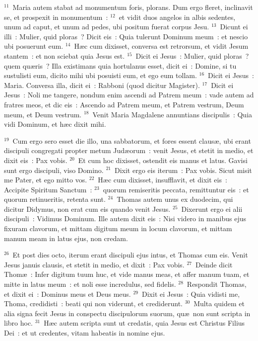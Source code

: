 ${}^{11}$~Maria autem stabat ad monumentum foris, plorans. Dum ergo fleret, inclinavit se, et prospexit in monumentum~:
${}^{12}$~et vidit duos angelos in albis sedentes, unum ad caput, et unum ad pedes, ubi positum fuerat corpus Jesu.
${}^{13}$~Dicunt ei illi~: Mulier, quid ploras~? Dicit eis~: Quia tulerunt Dominum meum~: et nescio ubi posuerunt eum.
${}^{14}$~H\ae c cum dixisset, conversa est retrorsum, et vidit Jesum stantem~: et non sciebat quia Jesus est.
${}^{15}$~Dicit ei Jesus~: Mulier, quid ploras~? quem qu\ae ris~? Illa existimans quia hortulanus esset, dicit ei~: Domine, si tu sustulisti eum, dicito mihi ubi posuisti eum, et ego eum tollam.
${}^{16}$~Dicit ei Jesus~: Maria. Conversa illa, dicit ei~: Rabboni (quod dicitur Magister).
${}^{17}$~Dicit ei Jesus~: Noli me tangere, nondum enim ascendi ad Patrem meum~: vade autem ad fratres meos, et dic eis~: Ascendo ad Patrem meum, et Patrem vestrum, Deum meum, et Deum vestrum.
${}^{18}$~Venit Maria Magdalene annuntians discipulis~: Quia vidi Dominum, et h\ae c dixit mihi.


${}^{19}$~Cum ergo sero esset die illo, una sabbatorum, et fores essent claus\ae , ubi erant discipuli congregati propter metum Jud\ae orum~: venit Jesus, et stetit in medio, et dixit eis~: Pax vobis.
${}^{20}$~Et cum hoc dixisset, ostendit eis manus et latus. Gavisi sunt ergo discipuli, viso Domino.
${}^{21}$~Dixit ergo eis iterum~: Pax vobis. Sicut misit me Pater, et ego mitto vos.
${}^{22}$~H\ae c cum dixisset, insufflavit, et dixit eis~: Accipite Spiritum Sanctum~:
${}^{23}$~quorum remiseritis peccata, remittuntur eis~: et quorum retinueritis, retenta sunt.
${}^{24}$~Thomas autem unus ex duodecim, qui dicitur Didymus, non erat cum eis quando venit Jesus.
${}^{25}$~Dixerunt ergo ei alii discipuli~: Vidimus Dominum. Ille autem dixit eis~: Nisi videro in manibus ejus fixuram clavorum, et mittam digitum meum in locum clavorum, et mittam manum meam in latus ejus, non credam.


${}^{26}$~Et post dies octo, iterum erant discipuli ejus intus, et Thomas cum eis. Venit Jesus januis clausis, et stetit in medio, et dixit~: Pax vobis.
${}^{27}$~Deinde dicit Thom\ae~: Infer digitum tuum huc, et vide manus meas, et affer manum tuam, et mitte in latus meum~: et noli esse incredulus, sed fidelis.
${}^{28}$~Respondit Thomas, et dixit ei~: Dominus meus et Deus meus.
${}^{29}$~Dixit ei Jesus~: Quia vidisti me, Thoma, credidisti~: beati qui non viderunt, et crediderunt.
${}^{30}$~Multa quidem et alia signa fecit Jesus in conspectu discipulorum suorum, qu\ae\ non sunt scripta in libro hoc.
${}^{31}$~H\ae c autem scripta sunt ut credatis, quia Jesus est Christus Filius Dei~: et ut credentes, vitam habeatis in nomine ejus.

